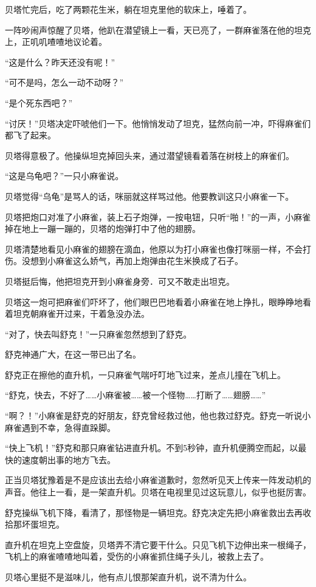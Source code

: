 \documentclass[a4paper,12pt,UTF8,twoside]{ctexbook}
\begin{document}
贝塔忙完后，吃了两颗花生米，躺在坦克里他的软床上，唾着了。

一阵吵闹声惊醒了贝塔，他趴在潜望镜上一看，天已亮了，一群麻雀落在他的坦克上，正叽叽喳喳地议论着。

“这是什么？昨天还没有呢！”

“可不是吗，怎么一动不动呀？”

“是个死东西吧？”

“讨厌！”贝塔决定吓唬他们一下。他悄悄发动了坦克，猛然向前一冲，吓得麻雀们都飞了起来。

贝塔得意极了。他操纵坦克掉回头来，通过潜望镜看着落在树枝上的麻雀们。

“这是乌龟吧？”一只小麻雀说。

贝塔觉得“乌龟”是骂人的话，咪丽就这样骂过他。他要教训这只小麻雀一下。

贝塔把炮口对准了小麻雀，装上石子炮弹，一按电钮，只听“啪！”的一声，小麻雀掉在地上一蹦一蹦的，贝塔的炮弹打中了他的翅膀。

贝塔清楚地看见小麻雀的翅膀在滴血，他原以为打小麻雀也像打咪丽一样，不会打伤。没想到小麻雀这么娇气，再加上炮弹由花生米换成了石子。

贝塔挺后悔，他把坦克开到小麻雀身旁．可又不敢走出坦克。

贝塔这一炮可把麻雀们吓坏了，他们眼巴巴地看着小麻雀在地上挣扎，眼睁睁地看着坦克朝麻雀开过来，干着急没办法。

“对了，快去叫舒克！”一只麻雀忽然想到了舒克。

舒克神通广大，在这一带已出了名。

舒克正在擦他的直升机，一只麻雀气喘吁叮地飞过来，差点儿撞在飞机上。

“舒克，快去，不好了……小麻雀被……被一个怪物……打断了……翅膀……”

“啊？！”小麻雀是舒克的好朋友，舒克曾经救过他，他也救过舒克。舒克一听说小麻雀遇到不幸，急得直跺脚。

“快上飞机！”舒克和那只麻雀钻进直升机。不到5秒钟，直升机便腾空而起，以最快的速度朝出事的地方飞去。

正当贝塔犹豫着是不是应该出去给小麻雀道歉时，忽然听见天上传来一阵发动机的声音。他往上一看，是一架直升机。贝塔在电视里见过这玩意儿，似乎也挺厉害。

舒克操纵飞机下降，看清了，那怪物是一辆坦克。舒克决定先把小麻雀救出去再收拾那坏蛋坦克。

直升机在坦克上空盘旋，贝塔弄不清它要干什么。只见飞机下边伸出来一根绳子，飞机上的麻雀喳喳地叫着，受伤的小麻雀抓住绳子头儿，被救上去了。

贝塔心里挺不是滋味儿，他有点儿恨那架直升机，说不清为什么。
\end{document}
